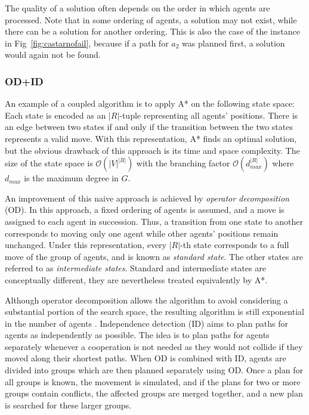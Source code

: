 The quality of a solution often depends on the order in which agents are processed. 
Note that in some ordering of agents, a solution may not exist, while there can be a solution for another ordering.
This is also the case of the instance in Fig~\ref{fig:castarnofail}, because if a path for $a_2$ was planned first, a solution would again not be found.

\subsubsection{OD+ID}

An example of a coupled algorithm is to apply A* on the following state space:
Each state is encoded as an $|R|$-tuple representing all agents' positions.
There is an edge between two states if and only if the transition between the two states represents a valid move.
With this representation, A* finds an optimal solution, but the obvious drawback of this approach is its time and space complexity.
The size of the state space is $\mathcal{O}(|V|^{|R|})$ with the branching factor $\mathcal{O}(d_{max}^{|R|})$ where $d_{max}$ is the maximum degree in $G$.

An improvement of this naive approach is achieved by \emph{operator decomposition} (OD)\cite{standley10}.
In this approach, a fixed ordering of agents is assumed, and a move is assigned to each agent in succession.
Thus, a transition from one state to another corresponds to  moving only one agent while other agents' positions remain unchanged.
Under this representation, every $|R|$-th state corresponds to a full move of the group of agents, and is known as \emph{standard state}. 
The other states are referred to as \emph{intermediate states}.
Standard and intermediate states are conceptually different, they are nevertheless treated equivalently by A*.

Although operator decomposition allows the algorithm to avoid considering a substantial portion of the search space, the resulting algorithm is still exponential in the number of agents \cite{standley10}.
Independence detection (ID) aims to plan paths for agents as independently as possible.
The idea is to plan paths for agents separately whenever a cooperation is not needed as they would not collide if they moved along their shortest paths.
When OD is combined with ID, agents are divided into groups which are then planned separately using OD.
Once a plan for all groups is known, the movement is simulated, and if the plans for two or more groups contain conflicts,
the affected groups are merged together, and a new plan is searched for these larger groups.

